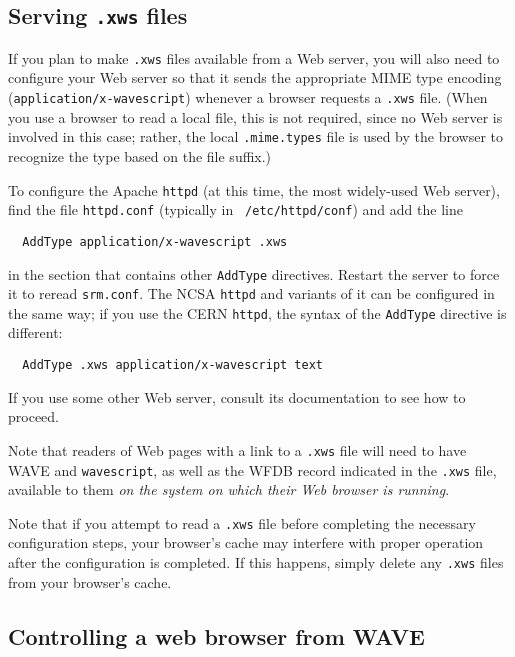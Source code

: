 \documentclass[twoside]{book}
\newcommand{\WAVE}{{\sf WAVE}\xspace}
\begin{document}
\subsection*{Serving {\tt .xws} files}
\label{sec:serving-xws}

If you plan to make {\tt .xws} files available from a Web server, you
will also need to configure your Web server so that it sends the
appropriate MIME type encoding ({\tt application/x-wavescript})
whenever a browser requests a {\tt .xws} file.  (When you use a
browser to read a local file, this is not required, since no Web
server is involved in this case; rather, the local {\tt .mime.types}
file is used by the browser to recognize the type based on the file
suffix.)

To configure the Apache {\tt httpd} (at this time, the most widely-used
Web server), find the file {\tt httpd.conf} (typically in {\tt
/etc/httpd/conf}) and add the line
\begin{verbatim}
  AddType application/x-wavescript .xws
\end{verbatim}
\noindent
in the section that contains other {\tt AddType} directives.  Restart
the server to force it to reread {\tt srm.conf}.  The NCSA {\tt httpd}
and variants of it can be configured in the same way;  if you use the
CERN {\tt httpd}, the syntax of the {\tt AddType} directive is different:
\begin{verbatim}
  AddType .xws application/x-wavescript text
\end{verbatim}
\noindent
If you use some other Web server, consult its documentation to see how
to proceed.

Note that readers of Web pages with a link to a {\tt .xws} file will
need to have \WAVE{} and {\tt wavescript}, as well as the WFDB record
indicated in the {\tt .xws} file, available to them \emph{on the
system on which their Web browser is running}.

Note that if you attempt to read a {\tt .xws} file before completing
the necessary configuration steps, your browser's cache may interfere
with proper operation after the configuration is completed.  If this
happens, simply delete any {\tt .xws} files from your browser's cache.

\subsection*{Controlling a web browser from \WAVE{}}
\end{document}

